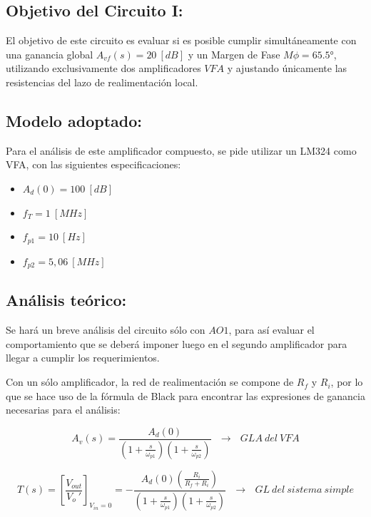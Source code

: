 \documentclass[12pt,a4paper]{article}
\begin{document}
\subsection{Objetivo del Circuito I:}

El objetivo de este circuito es evaluar si es posible cumplir simultáneamente con una ganancia global $A_{vf}(s) = 20~[dB]$ y un Margen de Fase $M\phi = \ang{65,5}$, utilizando exclusivamente dos amplificadores $VFA$ y ajustando únicamente las resistencias del lazo de realimentación local.
\\

\subsection{Modelo adoptado:}

Para el análisis de este amplificador compuesto, se pide utilizar un LM324 como VFA, con las siguientes especificaciones:

\begin{itemize}
    \item $A_d(0) = 100~[dB]$
    \item $f_T = 1~[MHz]$
    \item $f_{p1} = 10~[Hz]$        
    \item $f_{p2} = 5,06~[MHz]$
\end{itemize}
\hspace{0.5 cm}

\subsection{Análisis teórico:}

Se hará un breve análisis del circuito sólo con $AO1$, para así evaluar el comportamiento que se deberá imponer luego en el segundo amplificador para llegar a cumplir los requerimientos.

Con un sólo amplificador, la red de realimentación se compone de $R_f$ y $R_i$, por lo que se hace uso de la fórmula de Black para encontrar las expresiones de ganancia necesarias para el análisis:

   \begin{equation}
        \label{eq_27}
A_v(s) = \frac{A_d(0)}{\left(1+\frac{s}{\omega_{p1}}\right)\left(1+\frac{s}{\omega_{p2}}\right)}~~~\xrightarrow{} ~~~GLA~del~VFA
    \end{equation}

   \begin{equation}
        \label{eq_28}
T(s) = \left[\frac{V_{out}}{V_o~'}\right]_{V_{in}=0} = -\frac{A_d(0)\left(\frac{R_i}{R_f+R_i}\right)}{\left(1+\frac{s}{\omega_{p1}}\right)\left(1+\frac{s}{\omega_{p2}}\right)}~~~\xrightarrow{} ~~~GL~del~sistema~simple
    \end{equation}
\end{document}
